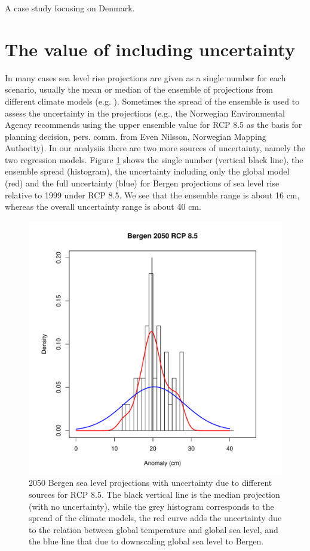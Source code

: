\documentclass[draft,linenumbers]{agujournal}
\begin{document}
A case study focusing on Denmark. 

\section{The value of including uncertainty}
\label{unc}

In many cases sea level rise projections are given as a single number for each scenario, usually the mean or median of the ensemble of projections from different climate models (e.g. \citet{climateimpactgroup}). Sometimes the spread of the ensemble is used to assess the uncertainty in the projections (e.g., the Norwegian Environmental Agency recommends using the upper ensemble value for RCP 8.5 as the basis for planning decision, pers. comm. from Even Nilsson, Norwegian Mapping Authority). In our analysiis there are two more sources of uncertainty, namely the two regression models. Figure \ref{fig:unc} shows the single number (vertical black line), the ensemble spread (histogram), the uncertainty including only the global model (red) and the full uncertainty (blue) for Bergen projections of sea level rise relative to 1999 under RCP 8.5. We see that the ensemble range is about 16 cm, whereas the overall uncertainty range is about 40 cm.


\begin{figure}[!hbpt]
\begin{center}
\includegraphics[width=0.5\linewidth]{unc.pdf}
\caption{2050 Bergen sea level projections with uncertainty due to different sources for RCP 8.5. The black vertical line is the median projection (with no uncertainty), while the grey histogram corresponds to the spread of the climate models, the red curve adds the uncertainty due to the relation between global temperature and global sea level, and the blue line that due to downscaling global sea level to Bergen. } 
\label{fig:unc}
\end{center}
\end{figure}
\end{document}
